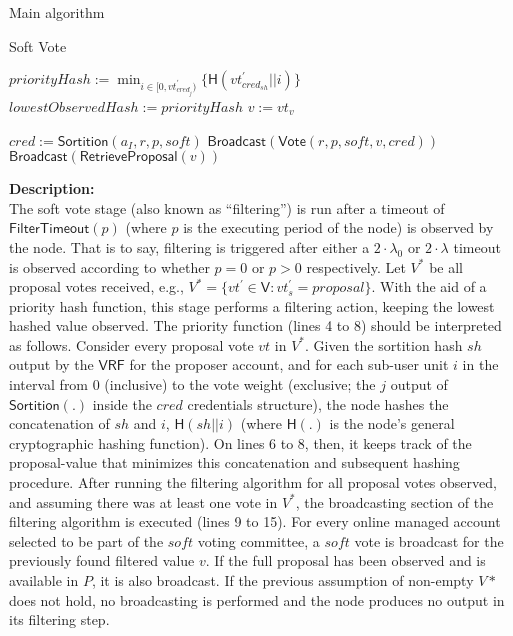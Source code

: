 \documentclass[10pt,a4paper]{article}
\begin{document}
\begin{section}{Main algorithm}
\begin{subsection}{Soft Vote}
\begin{algorithm}[H]
\begin{algorithmic}[1]
        \State $priorityHash := \min_{i \in [0, vt^\prime_{cred_j})} \{ \mathsf{H}(vt^\prime_{cred_{sh}} || i)\}$
            \State $lowestObservedHash := priorityHash$
            \State $v := vt_v$
        \EndIf    
    \EndFor

            \State $cred := \mathsf{Sortition}(a_I, r, p, soft)$
                \State $\mathsf{Broadcast}(\mathsf{Vote}(r, p, soft, v, cred))$
                    \State $\mathsf{Broadcast}(\mathsf{RetrieveProposal}(v))$
                \EndIf
            \EndIf
        \EndFor
    \EndIf

    \EndFunction
    \end{algorithmic}
\end{algorithm}

\noindent \textbf{Description:}\\
The soft vote stage (also known as ``filtering'') is run after a timeout of $\mathsf{FilterTimeout}(p)$
(where $p$ is the executing period of the node) is observed by the node. 
That is to say, filtering is triggered after either a $2\cdot\lambda_0$ or $2\cdot\lambda$ timeout is observed according 
to whether $p=0$ or $p>0$ respectively.
Let $V^*$ be all proposal votes received, e.g., $V^*=\{vt^\prime\in \mathsf{V} : vt^\prime_s = proposal\}$.
With the aid of a priority hash function, this stage performs a filtering action,
keeping the lowest hashed value observed.
The priority function (lines 4 to 8) should be interpreted as follows. Consider every proposal vote $vt$ in $V^*$.
Given the sortition hash $sh$ output by the $\mathsf{VRF}$ for the proposer account, and for each sub-user unit $i$ 
in the interval from $0$ (inclusive) to the vote weight (exclusive; the $j$ output of $\mathsf{Sortition}(.)$ inside 
the $cred$ credentials structure), the node hashes the concatenation of $sh$ and $i$, $\mathsf{H}(sh||i)$ 
(where $\mathsf{H}(.)$ is the node's general cryptographic hashing function). On lines 6 to 8, 
then, it keeps track of the proposal-value that minimizes this concatenation and subsequent hashing procedure.
After running the filtering algorithm for all proposal votes observed, and assuming there was at least one vote
in $V^*$, the broadcasting section of the filtering algorithm is executed (lines 9 to 15).
For every online managed account selected to be part of the $soft$ voting committee, a $soft$ vote is
broadcast for the previously found filtered value $v$. If the full proposal has been observed and is available in $P$,
it is also broadcast. 
If the previous assumption of non-empty $V*$ does not hold, no broadcasting is performed and the node produces no
output in its filtering step.


\end{subsection}
\end{section}
\end{document}
